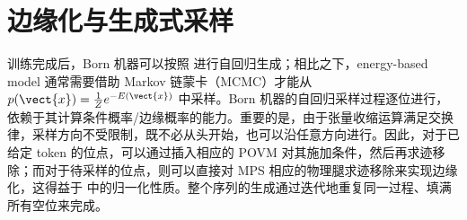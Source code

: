 \section{边缘化与生成式采样}

训练完成后，Born 机器可以按照  进行自回归生成；相比之下，energy-based model 通常需要借助 Markov 链蒙卡（MCMC）才能从 $p(\vect{x})=\frac{1}{Z}e^{-E(\vect{x})}$ 中采样。Born 机器的自回归采样过程逐位进行，依赖于其计算条件概率/边缘概率的能力。重要的是，由于张量收缩运算满足交换律，采样方向不受限制，既不必从头开始，也可以沿任意方向进行。因此，对于已给定 token 的位点，可以通过插入相应的 POVM 对其施加条件，然后再求迹移除；而对于待采样的位点，则可以直接对 MPS 相应的物理腿求迹移除来实现边缘化，这得益于  中的归一化性质。整个序列的生成通过迭代地重复同一过程、填满所有空位来完成。

